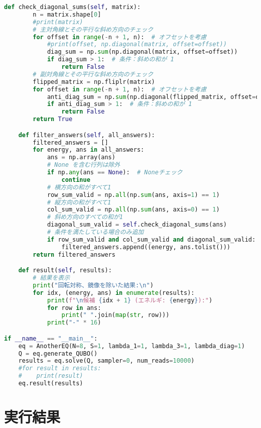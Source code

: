 \documentclass[uplatex,dvipdfmx,a4paper,11pt,oneside,openany]{jsbook}
\begin{document}
\begin{lstlisting}[language=Python]
    def check_diagonal_sums(self, matrix):
        n = matrix.shape[0]
        #print(matrix)
        # 主対角線とその平行な斜め方向のチェック
        for offset in range(-n + 1, n):  # オフセットを考慮
            #print(offset, np.diagonal(matrix, offset=offset))
            diag_sum = np.sum(np.diagonal(matrix, offset=offset))
            if diag_sum > 1:  # 条件：斜めの和が 1
                return False
        # 副対角線とその平行な斜め方向のチェック
        flipped_matrix = np.fliplr(matrix)
        for offset in range(-n + 1, n):  # オフセットを考慮
            anti_diag_sum = np.sum(np.diagonal(flipped_matrix, offset=offset))
            if anti_diag_sum > 1:  # 条件：斜めの和が 1
                return False
        return True

    def filter_answers(self, all_answers):
        filtered_answers = []
        for energy, ans in all_answers:
            ans = np.array(ans)
            # None を含む行列は除外
            if np.any(ans == None):  # Noneチェック
                continue
            # 横方向の和がすべて1
            row_sum_valid = np.all(np.sum(ans, axis=1) == 1)
            # 縦方向の和がすべて1
            col_sum_valid = np.all(np.sum(ans, axis=0) == 1)
            # 斜め方向のすべての和が1
            diagonal_sum_valid = self.check_diagonal_sums(ans)
            # 条件を満たしている場合のみ追加
            if row_sum_valid and col_sum_valid and diagonal_sum_valid:
                filtered_answers.append((energy, ans.tolist()))
        return filtered_answers

    def result(self, results):
        # 結果を表示
        print("回転対称、鏡像を除いた結果:\n")
        for idx, (energy, ans) in enumerate(results):
            print(f"\n候補 {idx + 1} (エネルギ: {energy}):")
            for row in ans:
                print(" ".join(map(str, row)))
            print("-" * 16)

if __name__ == "__main__":
    eq = AnotherEQ(N=8, S=1, lambda_1=1, lambda_3=1, lambda_diag=1)
    Q = eq.generate_QUBO()
    results = eq.solve(Q, sampler=0, num_reads=10000)
    #for result in results:
    #    print(result)
    eq.result(results)
\end{lstlisting}

\section{実行結果}
\end{document}

